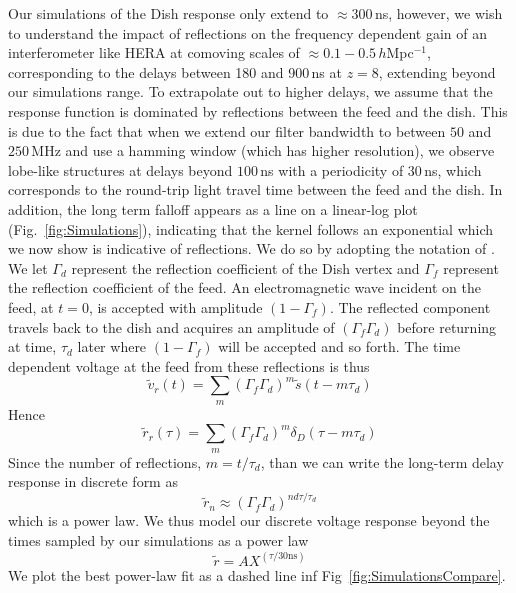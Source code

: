 \documentclass[twocolumn]{emulateapj}
\begin{document}
Our simulations of the Dish response only extend to $\approx 300$\,ns, however, we wish to understand the impact of reflections on the frequency dependent gain of an interferometer like HERA at comoving scales of $\approx 0.1-0.5$\,$h$Mpc$^{-1}$, corresponding to the delays between 180 and 900\,ns at $z=8$, extending beyond our simulations range. To extrapolate out to higher delays, we assume that the response function is dominated by reflections between the feed and the dish. This is due to the fact that when we extend our filter bandwidth to between $50$ and $250$\,MHz and use a hamming window (which has higher resolution), we observe lobe-like structures at delays beyond $100$\,ns with a periodicity of $30$\,ns, which corresponds to the round-trip light travel time between the feed and the dish.  In addition, the long term falloff appears as a line on a linear-log plot (Fig.~\ref{fig:Simulations}), indicating that the kernel follows an exponential which we now show is indicative of reflections. We do so by adopting the notation of \citep{Patra:2016}. We let $\Gamma_d$ represent the reflection coefficient of the Dish vertex and $\Gamma_f$ represent the reflection coefficient of the feed. An electromagnetic wave incident on the feed, at $t=0$, is accepted with amplitude $(1-\Gamma_f)$. The reflected component travels back to the dish and acquires an amplitude of $(\Gamma_f \Gamma_d)$ before returning at time, $\tau_d$ later where $(1-\Gamma_f)$ will be accepted and so forth. The time dependent voltage at the feed from these reflections is thus
\begin{equation}
\widetilde{v}_r(t) = \sum_m \left( \Gamma_f \Gamma_d \right)^m \widetilde{s}(t-m \tau_d)
\end{equation}
Hence
\begin{equation}
\widetilde{r}_r(\tau) = \sum_m \left( \Gamma_f \Gamma_d \right)^m \delta_D(\tau-m\tau_d)
\end{equation}
Since the number of reflections, $m=t/\tau_d$, than we can write the long-term delay response in discrete form as 
\begin{equation}
\widetilde{r}_n \approx (\Gamma_f \Gamma_d)^{n d\tau/\tau_d}
\end{equation}
which is a power law. We thus model our discrete voltage response beyond the times sampled by our simulations as a power law
\begin{equation}
\widetilde{r} = A X^{(\tau/30\text{ns})} 
\end{equation}
We plot the best power-law fit as a dashed line inf Fig~\ref{fig:SimulationsCompare}.
\end{document}
